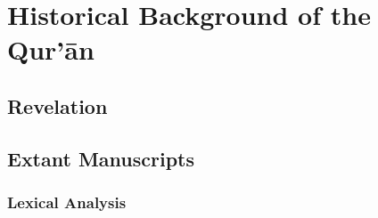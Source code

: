\chapter{Historical Background of the Qur'\=an}\label{ch:quran_history}
\section{Revelation}
\section{Extant Manuscripts}
\subsection{Lexical Analysis}